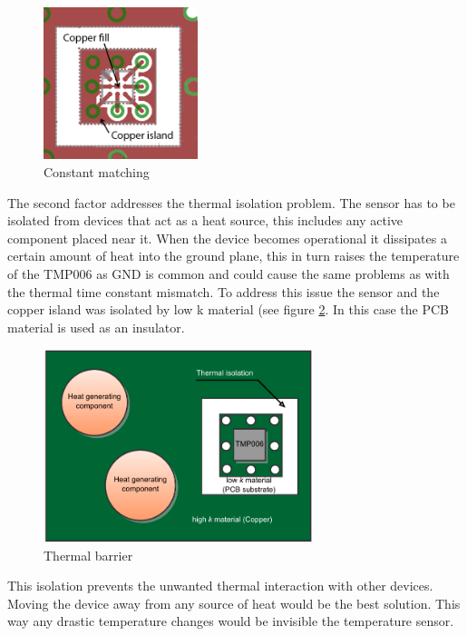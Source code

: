 \begin{figure}
\centering
\includegraphics[width=0.4\textwidth]{Images/constant_matching}
\caption{Constant matching}
\label{fig:constant_matching}
\end{figure}

The second factor addresses the thermal isolation problem. The sensor has to be isolated from devices that act as a heat source, this includes any active component placed near it. When the device becomes operational it dissipates a certain amount of heat into the ground plane, this in turn raises the temperature of the TMP006 as GND is common and could cause the same problems as with the thermal time constant mismatch. To address this issue the sensor and the copper island was isolated by low k material (see figure \ref{fig:thermal_barrier}. In this case the PCB material is used as an insulator.

\begin{figure}
\centering
\includegraphics[width=0.7\textwidth]{Images/temp_barrier}
\caption{Thermal barrier}
\label{fig:thermal_barrier}
\end{figure}

This isolation prevents the unwanted thermal interaction with other devices. Moving the device away from any source of heat would be the best solution. This way any drastic temperature changes would be invisible the temperature sensor.

